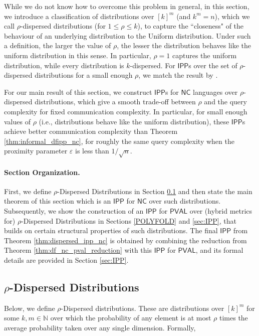 \documentclass[11pt]{article}
\newcommand{\NC}{\mathsf{NC}}
\newcommand{\PVAL}{\mathsf{PVAL}}
\newcommand{\IPP}{\mathsf{IPP}}
\newcommand{\N}{\mathbb{N}}
\begin{document}
While we do not know how to overcome this problem in general, in this section, we introduce a classification of distributions over $[k]^m$ (and $k^m = n$), which we call $\rho$-dispersed distributions (for $1 \leq \rho \leq k$), to capture the ``closeness" of the behaviour of an underlying distribution to the Uniform distribution. Under such a definition, the larger the value of $\rho$, the lesser the distribution behaves like the uniform distribution in this sense. In particular, $\rho = 1$ captures the uniform distribution, while every distribution is $k$-dispersed. For $\IPP$s over the set of $\rho$-dispersed distributions for a small enough $\rho$, we match the result by \cite{RVW}. 

For our main result of this section, we construct $\IPP$s for $\NC$ languages over $\rho$-dispersed distributions, which give a smooth trade-off between $\rho$ and the query complexity for fixed communication complexity. In particular, for small enough values of $\rho$ (i.e., distributions behave like the uniform distribution), these $\IPP$s achieve better communication complexity than Theorem \ref{thm:informal_dfipp_nc}, for roughly the same query complexity when the proximity parameter $\varepsilon $ is less than $1/\sqrt{n}$.

\paragraph{Section Organization.} 
First, we define $\rho$-Dispersed Distributions in Section \ref{sec:def_dispersed} and then  state the main theorem of this section which is an $\IPP$ for $\NC$ over such distributions. Subsequently, we show the construction of an $\IPP$ for $\PVAL$ over (hybrid metrics for) $\rho$-Dispersed Distributions in Sections \ref{POLYFOLD} and \ref{sec:IPP}, that builds on certain structural properties of such distributions. The final $\IPP$ from Theorem \ref{thm:dispersed_ipp_nc} is obtained by combining the reduction from Theorem \ref{thm:df_nc_pval_reduction} with this $\IPP$ for $\PVAL$, and its formal details are provided in Section \ref{sec:IPP}.

\subsection{$\rho$-Dispersed Distributions}
\label{sec:def_dispersed}
Below, we define $\rho$-Dispersed distributions. These are distributions over $[k]^{m}$ for some $k,m\in \N$ over which the probability of any element is at most $\rho$ times the average probability taken over any single dimension. Formally,
\end{document}
